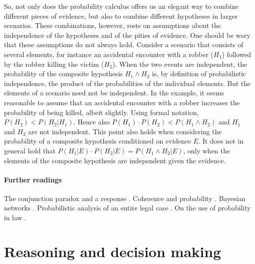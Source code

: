\documentclass[10pt]{article}
\begin{document}
So, not only does the probability calculus offers us an elegant way to combine different pieces of evidence, but also to combine 
different hypotheses in larger scenarios.
These combinations, however, rests on assumptions about the independence of the hypotheses and of the pities of evidence. 
One should be wary that these assumptions do not always hold. Consider a scenario that consists of several elements, for instance an accidental 
encounter with a robber ($H_1$) followed by the robber killing the victim ($H_2$). When the two events are independent, the probability of the composite hypothesis $H_1 \land H_2$ is, by definition of probabilistic independence, 
the product of the probabilities of the individual elements. But the elements of a scenario need not be 
independent. In the example, it seems reasonable to assume that an accidental encounter with a robber increases the probability of being killed, albeit slightly. Using formal notation, $P(H_2) < P(H_2 | H_1)$. Hence also $P(H_1) \cdot P(H_2) < P(H_1 \land H_2)$ and $H_1$ and $H_2$ are not independent. This point also holds when considering the probability of a composite hypothesis conditioned on evidence $E$. It does not in general hold that $P(H_1 | E) \cdot P(H_2 | E) = P(H_1 \land H_2 | E)$, only when the elements of the composite hypothesis are independent given the evidence.


\paragraph{Further readings}
The conjunction paradox \citep{cohen1977} and a response \citep{dawid1987}. 
Coherence and probability \citep{bovensHartman2003}.
Bayesian networks \citep{taroniEtal2006}. Probabilistic 
analysis of an entire legal case \citep{kadaneSchum1996}.
On the use of probability in law \citep{fenton2011}.






\section{Reasoning and decision making}
\label{sec:whenconv}
\label{sec:intexc}

\end{document}
